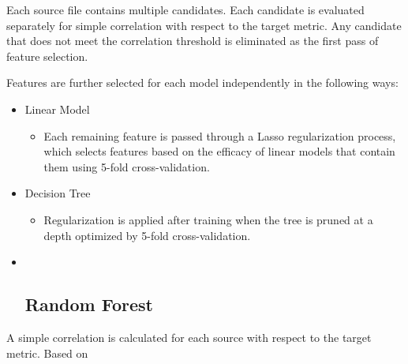 \documentclass[
]{article}
\providecommand{\tightlist}{%
  \setlength{\itemsep}{0pt}\setlength{\parskip}{0pt}}
\begin{document}
Each source file contains multiple candidates. Each candidate is
evaluated separately for simple correlation with respect to the target
metric. Any candidate that does not meet the correlation threshold is
eliminated as the first pass of feature selection.

Features are further selected for each model independently in the
following ways:

\begin{itemize}
\item
  Linear Model

  \begin{itemize}
  \tightlist
  \item
    Each remaining feature is passed through a Lasso regularization
    process, which selects features based on the efficacy of linear
    models that contain them using 5-fold cross-validation.
  \end{itemize}
\item
  Decision Tree

  \begin{itemize}
  \tightlist
  \item
    Regularization is applied after training when the tree is pruned at
    a depth optimized by 5-fold cross-validation.
  \end{itemize}
\item ~
  \hypertarget{random-forest-1}{%
  \subsection{Random Forest}\label{random-forest-1}}
\end{itemize}

A simple correlation is calculated for each source with respect to the
target metric. Based on
\end{document}
